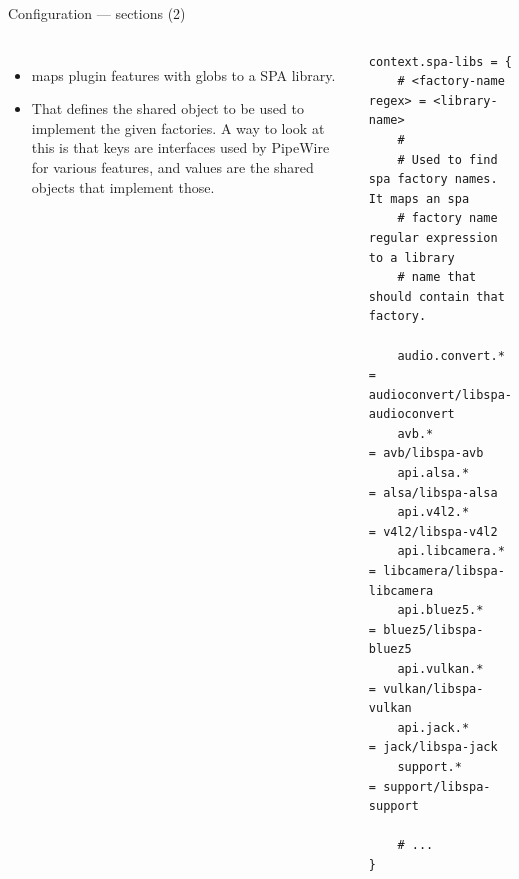 \begin{frame}[fragile]{Configuration — sections (2)}


  \begin{columns}
      \begin{itemize}
      \item {} maps plugin features with globs to a SPA
        library.
      \item That defines the shared object to be used to implement the
        given factories. A way to look at this is that keys are interfaces
        used by PipeWire for various features, and values are the shared
        objects that implement those.
      \end{itemize}

    \begin{block}{}
      \fontsize{7.3}{7.3}\selectfont
        \begin{verbatim}
context.spa-libs = {
    # <factory-name regex> = <library-name>
    #
    # Used to find spa factory names. It maps an spa
    # factory name regular expression to a library
    # name that should contain that factory.

    audio.convert.* = audioconvert/libspa-audioconvert
    avb.*           = avb/libspa-avb
    api.alsa.*      = alsa/libspa-alsa
    api.v4l2.*      = v4l2/libspa-v4l2
    api.libcamera.* = libcamera/libspa-libcamera
    api.bluez5.*    = bluez5/libspa-bluez5
    api.vulkan.*    = vulkan/libspa-vulkan
    api.jack.*      = jack/libspa-jack
    support.*       = support/libspa-support

    # ...
}
        \end{verbatim}
      \end{block}
  \end{columns}

\end{frame}



